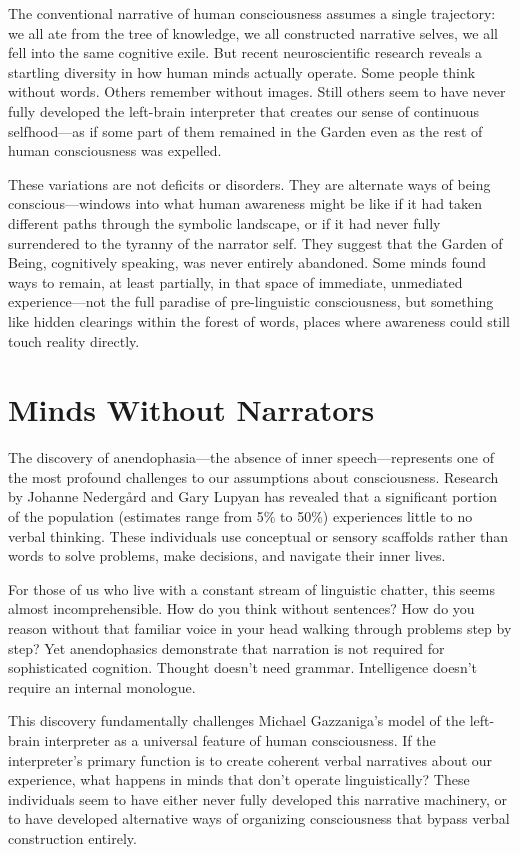 The conventional narrative of human consciousness assumes a single trajectory: we all ate from the tree of knowledge, we all constructed narrative selves, we all fell into the same cognitive exile. But recent neuroscientific research reveals a startling diversity in how human minds actually operate. Some people think without words. Others remember without images. Still others seem to have never fully developed the left-brain interpreter that creates our sense of continuous selfhood—as if some part of them remained in the Garden even as the rest of human consciousness was expelled.

These variations are not deficits or disorders. They are alternate ways of being conscious—windows into what human awareness might be like if it had taken different paths through the symbolic landscape, or if it had never fully surrendered to the tyranny of the narrator self. They suggest that the Garden of Being, cognitively speaking, was never entirely abandoned. Some minds found ways to remain, at least partially, in that space of immediate, unmediated experience—not the full paradise of pre-linguistic consciousness, but something like hidden clearings within the forest of words, places where awareness could still touch reality directly.

\section{Minds Without Narrators}

The discovery of anendophasia—the absence of inner speech—represents one of the most profound challenges to our assumptions about consciousness. Research by Johanne Nedergård and Gary Lupyan has revealed that a significant portion of the population (estimates range from 5\% to 50\%) experiences little to no verbal thinking. These individuals use conceptual or sensory scaffolds rather than words to solve problems, make decisions, and navigate their inner lives.

For those of us who live with a constant stream of linguistic chatter, this seems almost incomprehensible. How do you think without sentences? How do you reason without that familiar voice in your head walking through problems step by step? Yet anendophasics demonstrate that narration is not required for sophisticated cognition. Thought doesn't need grammar. Intelligence doesn't require an internal monologue.

This discovery fundamentally challenges Michael Gazzaniga's model of the left-brain interpreter as a universal feature of human consciousness. If the interpreter's primary function is to create coherent verbal narratives about our experience, what happens in minds that don't operate linguistically? These individuals seem to have either never fully developed this narrative machinery, or to have developed alternative ways of organizing consciousness that bypass verbal construction entirely.

